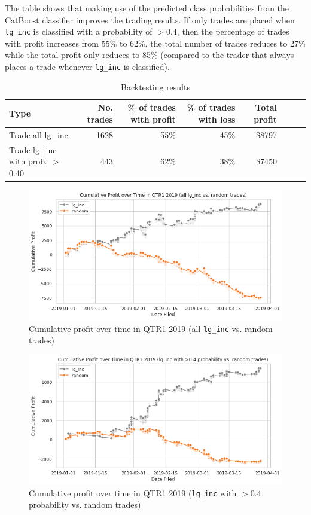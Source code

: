 \documentclass{article}
\begin{document}
	The table shows that making use of the predicted class probabilities from the CatBoost classifier improves the trading results. If only trades are placed when \lstinline{lg_inc} is classified with a probability of $>0.4$, then the percentage of trades with profit increases from 55\% to 62\%, the total number of trades reduces to 27\% while the total profit only reduces to 85\% (compared to the trader that always places a trade whenever \lstinline{lg_inc} is classified).
	

	\begin{table}[h!]
		\centering
		\caption{Backtesting results}
		\label{table:results_trading}
		
		\begin{tabular}{lrrrrrrr}
			\toprule
			Type &    No. trades &  \% of trades with profit &     \% of trades with loss &     Total profit \\
			\midrule
			Trade all lg\_inc  &  1628 &  55\% &   45\% & \$8797 \\
			Trade lg\_inc with prob. $>$ 0.40  & 443 & 62\% &  38\% &  \$7450 \\
			\bottomrule
		\end{tabular}
		
	\end{table}%

	\begin{figure}[h!]
		\includegraphics[width=\linewidth]{img/trade_lg_inc_all.png}
		\caption{Cumulative profit over time in QTR1 2019 (all \lstinline{lg_inc} vs. random trades)}
		\label{fig:trade_lg_inc_all}
	\end{figure}


	\begin{figure}[h!]
		\includegraphics[width=\linewidth]{img/trade_lg_inc_40.png}
		\caption{Cumulative profit over time in QTR1 2019 (\lstinline{lg_inc} with $>0.4$ probability vs. random trades)}
		\label{fig:trade_lg_inc_0.4}
	\end{figure}
\end{document}
